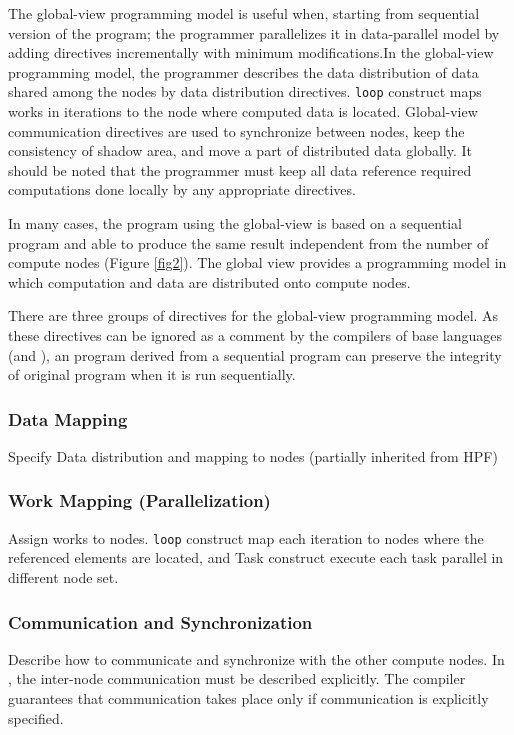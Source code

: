 The global-view
programming model is useful when, starting from sequential version of
the program; the programmer parallelizes it in data-parallel model by
adding directives incrementally with minimum modifications.In the
global-view programming model, the programmer describes the data
distribution of data shared among the nodes by data distribution
directives. {\tt loop} construct maps works in iterations to the node where
computed data is located. Global-view communication directives are
used to synchronize between nodes, keep the consistency of shadow
area, and move a part of distributed data globally. It should be noted
that the programmer must keep all data reference required computations
done locally by any appropriate directives. 

In many cases, the
\XMP program using the global-view is based on a sequential
program and able to produce the same result independent from the
number of compute nodes (Figure \ref{fig2}). The
global view provides a 
programming model in which computation and data are distributed onto
compute nodes.

There are three groups of directives for the
global-view programming model. As these directives can be ignored as a
comment by the compilers of base languages (\C and \Fort), an
\XMP program derived from a sequential program can preserve the
integrity of original program when it is run sequentially. 

\subsubsection*{Data Mapping}
Specify Data distribution and mapping to nodes (partially
inherited from HPF)

\subsubsection*{Work Mapping (Parallelization)}
Assign works to nodes. {\tt loop} construct map each iteration to
nodes where the referenced elements are located, and Task construct
execute each task parallel in different node set.

\subsubsection*{Communication and Synchronization}
Describe how to communicate and synchronize with the other compute
nodes. In \XMP, the inter-node communication must be described
explicitly. The compiler guarantees that communication takes place
only if communication is explicitly specified.

